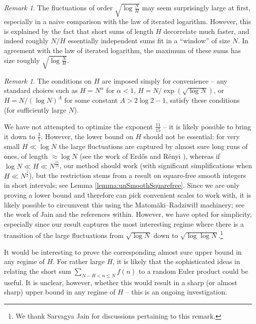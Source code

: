 \documentclass[11pt]{tran-l}
\theoremstyle{definition}
\theoremstyle{remark}
\newtheorem{remark}[theorem]{Remark}
\numberwithin{equation}{section}
\begin{document}
\begin{remark}
    The fluctuations of order $\sqrt{\log\frac{N}{H}}$ may seem surprisingly large at first, especially in a naive comparison with the law of iterated logarithm. However, this is explained by the fact that short sums of length $H$ decorrelate much faster, and indeed roughly $N/H$ essentially independent sums fit in a ``window'' of size $N$. In agreement with the law of iterated logarithm, the maximum of these sums has size roughly $\sqrt{\log\frac{N}{H}}$. 
\end{remark}

\begin{remark}
    The conditions on $H$ are imposed simply for convenience -- any standard choices such as $H=N^{\alpha}$ for $\alpha < 1$, $H = N/\exp\left(\sqrt{\log N}\right)$, or $H = N/(\log N)^A$ for some constant $A>2\log 2-1$, satisfy these conditions (for sufficiently large $N$). 
    
    We have not attempted to optimize the exponent $\frac{11}{15}$ -- it is likely possible to bring it down to $\frac{3}{5}$. However, the lower bound on $H$ should not be essential: for very small $H\ll \log N$ the large fluctuations are captured by almost sure long runs of ones, of length $\approx \log N$ (see the work of Erdős and Rényi \cite{ErdosRenyi1970}), whereas if $\log N\ll H\ll N^{\frac{11}{15}}$, our method should work (with significant simplifications when $H\ll N^{\frac{1}{2}}$), but the restriction stems from a result on square-free smooth integers in short intervals; see Lemma \ref{lemma:unSmoothSquarefree}. Since we are only proving a lower bound and therefore can pick convenient scales to work with, it is likely possible to circumvent this using the Matom\"aki--Radziwiłł machinery; see the work of Jain \cite{jain2025smooth} and the references within. However, we have opted for simplicity, especially since our result captures the most interesting regime where there is a transition of the large fluctuations from $\sqrt{\log N}$ down to $\sqrt{\log \log N}$.\footnote{We thank Sarvagya Jain for discussions pertaining to this remark.}
\end{remark}

It would be interesting to prove the corresponding almost sure upper bound in any regime of $H$. For rather large $H$, it is likely that the sophisticated ideas in \cite{LauTenenbaumWu2013MeanValuesRMF, Mastrostefano2022, Hardy2023AlmostSure, Atherfold2025} relating the short sum $\sum_{N-H<n\leq N} f(n)$ to a random Euler product could be useful. It is unclear, however, whether this would result in a sharp (or almost sharp) upper bound in any regime of $H$ -- this is an ongoing investigation. 
\end{document}
